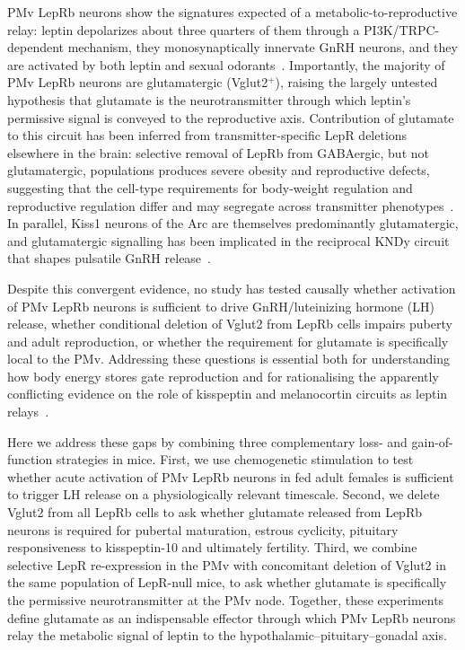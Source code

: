 PMv LepRb neurons show the signatures expected of a metabolic-to-reproductive relay: leptin depolarizes about three quarters of them through a PI3K/TRPC-dependent mechanism, they monosynaptically innervate GnRH neurons, and they are activated by both leptin and sexual odorants~\cite{williams2011acute,leshan2009direct}. Importantly, the majority of PMv LepRb neurons are glutamatergic (Vglut2$^+$), raising the largely untested hypothesis that glutamate is the neurotransmitter through which leptin's permissive signal is conveyed to the reproductive axis. Contribution of glutamate to this circuit has been inferred from transmitter-specific LepR deletions elsewhere in the brain: selective removal of LepRb from GABAergic, but not glutamatergic, populations produces severe obesity and reproductive defects, suggesting that the cell-type requirements for body-weight regulation and reproductive regulation differ and may segregate across transmitter phenotypes~\cite{martin2014leptinresponsive}. In parallel, Kiss1 neurons of the Arc are themselves predominantly glutamatergic, and glutamatergic signalling has been implicated in the reciprocal KNDy circuit that shapes pulsatile GnRH release~\cite{cravo2011kiss1,navarro2013interactions,navarro2011regulation}.

Despite this convergent evidence, no study has tested causally whether activation of PMv LepRb neurons is sufficient to drive GnRH/luteinizing hormone (LH) release, whether conditional deletion of Vglut2 from LepRb cells impairs puberty and adult reproduction, or whether the requirement for glutamate is specifically local to the PMv. Addressing these questions is essential both for understanding how body energy stores gate reproduction and for rationalising the apparently conflicting evidence on the role of kisspeptin and melanocortin circuits as leptin relays~\cite{louis2011molecular,amstalden2011neuroendocrine,gottsch2004role,iqbal2001evidence}.

Here we address these gaps by combining three complementary loss- and gain-of-function strategies in mice. First, we use chemogenetic stimulation to test whether acute activation of PMv LepRb neurons in fed adult females is sufficient to trigger LH release on a physiologically relevant timescale. Second, we delete Vglut2 from all LepRb cells to ask whether glutamate released from LepRb neurons is required for pubertal maturation, estrous cyclicity, pituitary responsiveness to kisspeptin-10 and ultimately fertility. Third, we combine selective LepR re-expression in the PMv with concomitant deletion of Vglut2 in the same population of LepR-null mice, to ask whether glutamate is specifically the permissive neurotransmitter at the PMv node. Together, these experiments define glutamate as an indispensable effector through which PMv LepRb neurons relay the metabolic signal of leptin to the hypothalamic--pituitary--gonadal axis.

